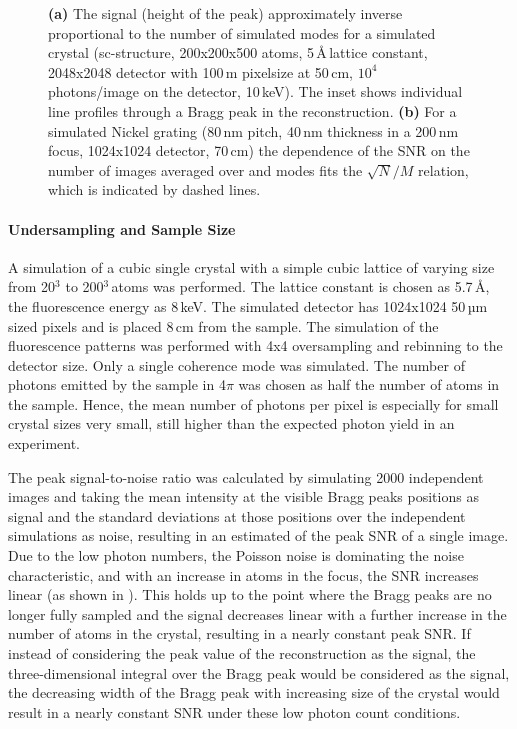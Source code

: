 \begin{figure}
	\caption[SNR dependence on the number of modes and images]{
		\textbf{(a)} The signal (height of the peak) approximately inverse proportional to the number of simulated modes for a simulated crystal
		(sc-structure, 200x200x500 atoms, 5\,\AA\,lattice constant, 2048x2048 detector with 100\,\textmu m pixelsize at 50\,cm, $10^4$ photons/image on the detector, 10\,keV). The inset shows individual line profiles through a Bragg peak in the reconstruction. \textbf{(b)} For a simulated Nickel grating (80\,nm pitch, 40\,nm thickness in a 200\,nm focus, 1024x1024 detector, 70\,cm) the dependence of the SNR on the number of images averaged over and modes fits the $\sqrt{N}/M$ relation, which is indicated by dashed lines.}
\end{figure}

\paragraph{Undersampling and  Sample Size}


A simulation of a cubic single crystal with a simple cubic lattice of varying size from 20$^3$ to 200$^3$\,atoms was performed. The lattice constant is chosen as 5.7\,\AA, the fluorescence energy as 8\,keV. The simulated detector has 1024x1024 50\,µm sized pixels and is placed 8\,cm from the  sample. The simulation of the fluorescence patterns was performed with 4x4 oversampling and rebinning to the detector size. Only a single coherence mode was simulated. The number of photons emitted by the sample in 4$\pi$ was chosen as half the number of atoms in the sample. Hence, the mean number of photons per pixel is especially for small crystal sizes very small, still higher than the expected photon yield in an experiment.

The peak signal-to-noise ratio was calculated by simulating 2000 independent images and taking the mean intensity at the visible Bragg peaks positions as signal and the standard deviations at those positions over the independent simulations as noise, resulting in an estimated of the peak SNR of a single image.
Due to the low photon numbers, the Poisson noise is dominating the noise characteristic, and with an increase in atoms in the focus, the SNR increases linear (as shown in ). This holds up to the point where the Bragg peaks are no longer fully sampled and the signal decreases linear with a further increase in the number of atoms in the crystal, resulting in a nearly constant peak SNR.
If instead of considering the peak value of the reconstruction as the signal, the three-dimensional integral over the Bragg peak would be considered as the signal, the decreasing width of the Bragg peak with increasing size of the crystal would result in a nearly constant SNR under these low photon count conditions. 



